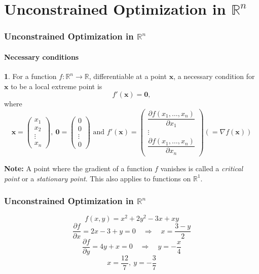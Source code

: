 \documentclass[10pt]{beamer}
\theoremstyle{definition}
\newtheorem{Fact}{\translate{Fact}}
\begin{document}
\section{Unconstrained Optimization in $ \mathbb{R}^n $}\label{sec:Rn}

\begin{frame}[fragile]
\frametitle{Unconstrained Optimization in $ \mathbb{R}^n $}
\framesubtitle{Necessary conditions}
\begin{Fact}
For a function $ f: \mathbb{R}^n \rightarrow \mathbb{R}$, differentiable at a point $ \mathbf{x} $, a necessary condition for $ \mathbf{x} $ to be a local extreme point is \[ f'(\mathbf{x}) = \mathbf{0}, \]
where \[ \mathbf{x} = \left( \begin{array}{c}
x_1 \\
x_2\\
\vdots \\
x_n
\end{array}\right),~\mathbf{0} = \left( \begin{array}{c}
0 \\
0 \\
\vdots \\
0
\end{array}\right)\text{ and }  f'(\mathbf{x})  = \left( \begin{array}{c}
\dfrac{\partial f(x_1,\ldots,x_n)}{\partial x_1}\\
\vdots \\
\dfrac{\partial f(x_1,\ldots,x_n)}{\partial x_n}
\end{array}\right)(= \nabla f(\mathbf{x})) \]
\label{fc:NCsRn}
\end{Fact}

\textbf{Note:} A point where the gradient of a function $ f $ vanishes is called a \emph{critical point} or a \emph{stationary point}. This also applies to functions on $ \mathbb{R}^1 $.
\end{frame}

\begin{frame}[fragile]
\frametitle{Unconstrained Optimization in $ \mathbb{R}^n $}
\begin{example}
\[ f(x,y) = x^2 +2y^2-3x+xy \]
\[ \frac{\partial f}{\partial x} = 2x-3+y=0\quad \Rightarrow \quad x=\frac{3-y}{2} \]
\[ \frac{\partial f}{\partial y} = 4y+x = 0\quad \Rightarrow \quad y = -\frac{x}{4}\]
\[ x=\frac{12}{7},~y=-\frac{3}{7} \]
\label{ex:locminR2}
\end{example}
\end{frame}
\end{document}

